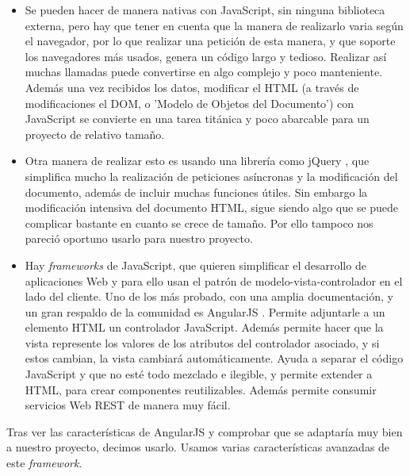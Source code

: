 \begin{itemize}
\item
Se pueden hacer de manera nativas con JavaScript, sin ninguna biblioteca externa, pero hay que tener en cuenta que la manera de realizarlo varia según el navegador,  por lo que realizar una petición de esta manera, y que soporte los navegadores más usados, genera un código largo y tedioso. Realizar así muchas llamadas puede convertirse en algo complejo y poco manteniente. Además una vez recibidos los datos, modificar el HTML (a través de modificaciones el DOM, o 'Modelo de Objetos del Documento') con JavaScript se convierte en una tarea titánica y poco abarcable para un proyecto de relativo tamaño.

\item
Otra manera de realizar esto es usando una librería como jQuery \cite{jQuery}, que simplifica mucho la realización de peticiones asíncronas y la modificación del documento, además de incluir muchas funciones útiles. Sin embargo la modificación intensiva del documento HTML, sigue siendo algo que se puede complicar bastante en cuanto se crece de tamaño. Por ello tampoco nos pareció oportuno usarlo para nuestro proyecto.

\item
Hay \emph{frameworks} de JavaScript, que quieren simplificar el desarrollo de aplicaciones Web y para ello usan el patrón de modelo-vista-controlador en el lado del cliente. Uno de los más probado, con una amplia documentación, y un gran respaldo de la comunidad es AngularJS \cite{angular}. Permite adjuntarle a un elemento HTML un controlador JavaScript. Además permite hacer que la vista represente los valores de los atributos del controlador asociado, y si estos cambian, la vista cambiará automáticamente. Ayuda a separar el código JavaScript y que no esté todo mezclado e ilegible, y permite extender a HTML, para crear componentes reutilizables. Además permite consumir servicios Web REST de manera muy fácil.
\end{itemize}


Tras ver las características de AngularJS y comprobar que se adaptaría muy bien a nuestro proyecto, decimos usarlo. Usamos varias características avanzadas de este \emph{framework}.

